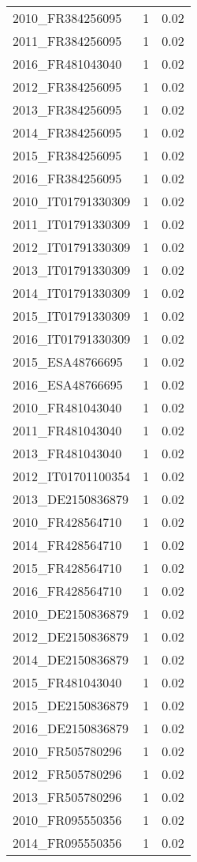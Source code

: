 \begin{table*}[htbp]
\begin{tabular}{lrr}
2010_FR384256095 & 1 & 0.02 \\
2011_FR384256095 & 1 & 0.02 \\
2016_FR481043040 & 1 & 0.02 \\
2012_FR384256095 & 1 & 0.02 \\
2013_FR384256095 & 1 & 0.02 \\
2014_FR384256095 & 1 & 0.02 \\
2015_FR384256095 & 1 & 0.02 \\
2016_FR384256095 & 1 & 0.02 \\
2010_IT01791330309 & 1 & 0.02 \\
2011_IT01791330309 & 1 & 0.02 \\
2012_IT01791330309 & 1 & 0.02 \\
2013_IT01791330309 & 1 & 0.02 \\
2014_IT01791330309 & 1 & 0.02 \\
2015_IT01791330309 & 1 & 0.02 \\
2016_IT01791330309 & 1 & 0.02 \\
2015_ESA48766695 & 1 & 0.02 \\
2016_ESA48766695 & 1 & 0.02 \\
2010_FR481043040 & 1 & 0.02 \\
2011_FR481043040 & 1 & 0.02 \\
2013_FR481043040 & 1 & 0.02 \\
2012_IT01701100354 & 1 & 0.02 \\
2013_DE2150836879 & 1 & 0.02 \\
2010_FR428564710 & 1 & 0.02 \\
2014_FR428564710 & 1 & 0.02 \\
2015_FR428564710 & 1 & 0.02 \\
2016_FR428564710 & 1 & 0.02 \\
2010_DE2150836879 & 1 & 0.02 \\
2012_DE2150836879 & 1 & 0.02 \\
2014_DE2150836879 & 1 & 0.02 \\
2015_FR481043040 & 1 & 0.02 \\
2015_DE2150836879 & 1 & 0.02 \\
2016_DE2150836879 & 1 & 0.02 \\
2010_FR505780296 & 1 & 0.02 \\
2012_FR505780296 & 1 & 0.02 \\
2013_FR505780296 & 1 & 0.02 \\
2010_FR095550356 & 1 & 0.02 \\
2014_FR095550356 & 1 & 0.02 \\

\end{tabular}
\end{table*}
